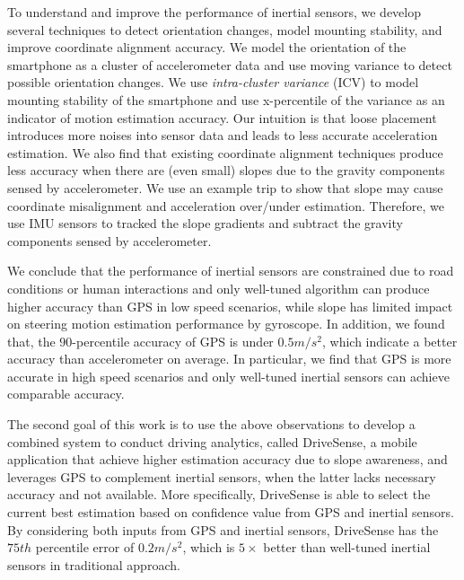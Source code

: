 To understand and improve the performance of inertial sensors, 
we develop several 
techniques to detect orientation changes, model mounting stability, 
and improve coordinate alignment accuracy. 
We model the orientation of the smartphone as a cluster
of accelerometer data and 
use moving variance to detect possible orientation changes. 
We use \emph{intra-cluster variance} (ICV) to model mounting stability 
of the smartphone and use x-percentile of the variance 
as an indicator of motion estimation accuracy. 
Our intuition is that loose placement introduces more noises 
into sensor data and leads to less accurate acceleration estimation. 
We also find that existing coordinate alignment techniques produce
less accuracy when there are (even small) slopes due to the gravity
components sensed by accelerometer. 
We use an example trip to show that slope may cause coordinate misalignment 
and acceleration over/under estimation. 
Therefore, we use IMU sensors to tracked the slope gradients and subtract
the gravity components sensed by accelerometer. 


We conclude that the performance of inertial sensors are constrained due to
road conditions or human interactions and only well-tuned algorithm can produce higher accuracy 
than GPS in low speed scenarios, 
while slope has limited impact on steering motion estimation performance by gyroscope. 
In addition, we found that, the $90$-percentile accuracy of GPS is under $0.5m/s^2$, 
which indicate a better accuracy than accelerometer on average. 
In particular, we find that GPS is more accurate in high speed scenarios and 
only well-tuned inertial sensors can achieve comparable accuracy. 


The second goal of this work is to use the above observations to develop a combined system
to conduct driving analytics, called DriveSense, a mobile application that achieve
higher estimation accuracy due to slope awareness, and leverages GPS to complement
inertial sensors, when the latter lacks necessary accuracy and not available. 
More specifically,
DriveSense is able to select the current best estimation 
based on confidence value from GPS and inertial sensors. 
By considering both inputs from GPS and inertial sensors, 
DriveSense has the $75th$ percentile error of $0.2m/s^2$, 
which is $5\times$ better than well-tuned inertial sensors in traditional approach. 


